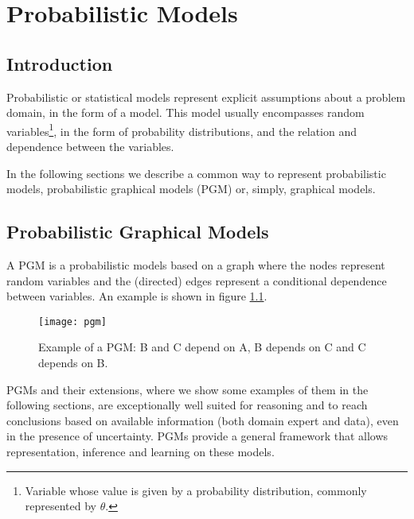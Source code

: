 \chapter{Probabilistic Models} \label{chap:models}

\section*{}

\section{Introduction}

Probabilistic or statistical models represent explicit assumptions about a problem domain, in the form of a model. This model usually encompasses random variables\footnote{Variable whose value is given by a probability distribution, commonly represented by $\theta$.}, in the form of probability distributions, and the relation and dependence between the variables. \cite{Winn2013}

In the following sections we describe a common way to represent probabilistic models, probabilistic graphical models (PGM) or, simply, graphical models.

\section{Probabilistic Graphical Models}

A PGM is a probabilistic models based on a graph where the nodes represent random variables and the (directed) edges represent a conditional dependence between variables. An example is shown in figure \ref{fig:pgm}.

\begin{figure}[h]
	\begin{center}
		\leavevmode
		\texttt{[image: pgm]}
		\caption{Example of a PGM: B and C depend on A, B depends on C and C depends on B. }
		\label{fig:pgm}
	\end{center}
\end{figure}

PGMs and their extensions, where we show some examples of them in the following sections, are exceptionally well suited for reasoning and to reach conclusions based on available information (both domain expert and data), even in the presence of uncertainty. PGMs provide a general framework that allows representation, inference and learning on these models. \cite{koller2009probabilistic}

